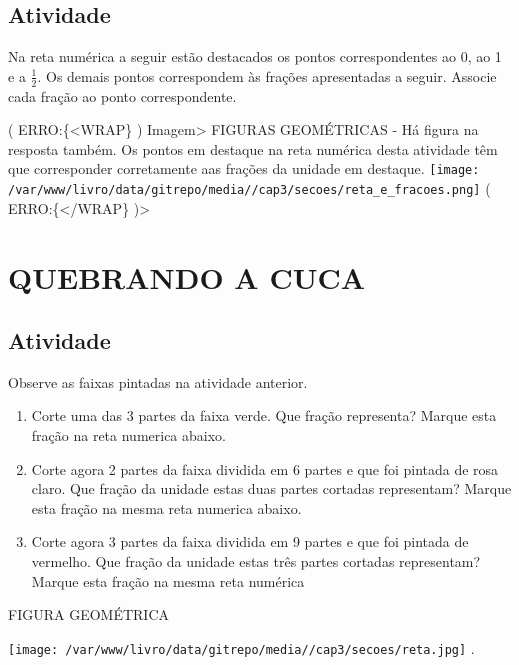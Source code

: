\documentclass[a4,12pt]{book}
\begin{document}
\subsection{Atividade}

Na reta numérica a seguir estão destacados os pontos correspondentes ao 0, ao 1 e a $\frac{1}{2}$. Os demais pontos correspondem às frações apresentadas a seguir. Associe cada fração ao ponto correspondente.  

( ERRO:\{<WRAP\} ) Imagem> FIGURAS GEOMÉTRICAS - Há figura na resposta também.
Os pontos em destaque na reta numérica desta atividade têm que corresponder corretamente aas frações da unidade em destaque.
\texttt{[image: /var/www/livro/data/gitrepo/media//cap3/secoes/reta\_e\_fracoes.png]}
( ERRO:\{</WRAP\} )>

\section{QUEBRANDO A CUCA }


\subsection{Atividade}

Observe as faixas pintadas na atividade anterior. 

\begin{enumerate} [\quad a)] %
  \item     Corte uma das 3 partes da faixa verde. Que fração representa? Marque esta fração na reta numerica abaixo.
  \item     Corte agora 2 partes da faixa dividida em 6 partes e que foi pintada de rosa claro. Que fração da unidade estas duas partes cortadas representam? Marque esta fração na mesma reta numerica abaixo.
  \item     Corte agora 3 partes da faixa dividida em 9 partes e que foi pintada de vermelho. Que fração da unidade estas três partes cortadas representam? Marque esta fração na mesma reta numérica
\end{enumerate} %


\begin{imagem*}[breakable]{}{}   FIGURA GEOMÉTRICA  
  
    \texttt{[image: /var/www/livro/data/gitrepo/media//cap3/secoes/reta.jpg]}  .  
  
\end{imagem*}
\end{document}
